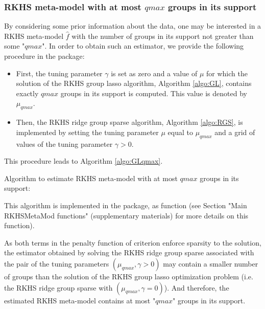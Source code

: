 \subsubsection{RKHS meta-model with at most $qmax$ groups in its support}\label{subsec:optimqmax}
By considering some prior information about the data, one may be interested in a RKHS meta-model $\widehat{f}$ with the number of groups in its support not greater than some "$qmax$". In order to obtain such an estimator, we provide the following procedure in the  package: 
\begin{itemize}
\item First, the tuning parameter $\gamma$ is set as zero and a value of $\mu$ for which the solution of the RKHS group lasso algorithm, Algorithm \ref{algo:GL}, contains exactly $qmax$ groups in its support is computed. This value is denoted by $\mu_{qmax}$.
\item Then, the RKHS ridge group sparse algorithm, Algorithm \ref{algo:RGS}, is implemented by setting the tuning parameter $\mu$ equal to $\mu_{qmax}$ and a grid of values of the tuning parameter $\gamma>0$.
\end{itemize}
This procedure leads to Algorithm \ref{algo:GLqmax}. 
\begin{algorithm}[h!]
\caption{Algorithm to estimate RKHS meta-model with at most $qmax$ groups in its support:}\label{algo:GLqmax}
\small{
{\setlength{\tabcolsep}{4pt}
\begin{algorithmic}[1]
 
\Repeat
    \Else
    \EndIf 
{} 
\end{algorithmic}}}
\end{algorithm}
This algorithm is implemented in the  package, as function  (see Section "Main RKHSMetaMod functions" (supplementary materials) for more details on this function). 
\begin{rem}
As both terms in the penalty function of criterion  enforce sparsity to the solution, the estimator obtained by solving the RKHS ridge group sparse associated with the pair of the tuning parameters $(\mu_{qmax},\gamma>0)$ may contain a smaller number of groups than the solution of the RKHS group lasso optimization problem (i.e. the RKHS ridge group sparse with $(\mu_{qmax},\gamma=0)$). And therefore, the estimated RKHS meta-model contains at most "$qmax$" groups in its support. 
\end{rem}
